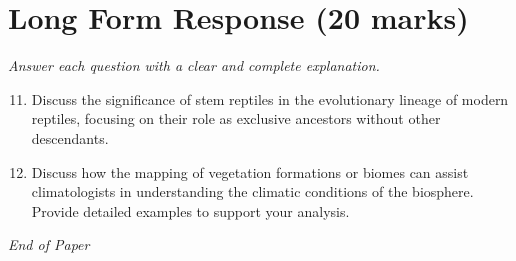 \documentclass[12pt]{article}
\begin{document}
\section*{Long Form Response (20 marks)}
\textit{Answer each question with a clear and complete explanation.}
\begin{enumerate}[label=\arabic*.]
\setcounter{enumi}{10}
\item Discuss the significance of stem reptiles in the evolutionary lineage of modern reptiles, focusing on their role as exclusive ancestors without other descendants.
\item Discuss how the mapping of vegetation formations or biomes can assist climatologists in understanding the climatic conditions of the biosphere. Provide detailed examples to support your analysis.
\end{enumerate}

\vfill
\noindent\textit{End of Paper}
\end{document}
